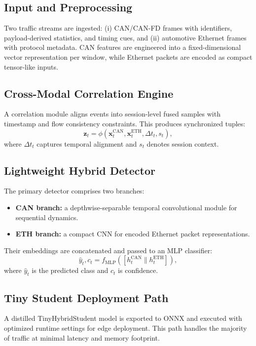 \documentclass[conference]{IEEEtran}
\begin{document}
\subsection{Input and Preprocessing}
Two traffic streams are ingested: (i) CAN/CAN-FD frames with identifiers, payload-derived statistics, and timing cues, and (ii) automotive Ethernet frames with protocol metadata. CAN features are engineered into a fixed-dimensional vector representation per window, while Ethernet packets are encoded as compact tensor-like inputs.

\subsection{Cross-Modal Correlation Engine}
A correlation module aligns events into session-level fused samples with timestamp and flow consistency constraints. This produces synchronized tuples:
\begin{equation}
\mathbf{z}_t = \phi\!\left(\mathbf{x}^{\text{CAN}}_t,\mathbf{x}^{\text{ETH}}_t,\Delta t_t, s_t\right),
\end{equation}
where $\Delta t_t$ captures temporal alignment and $s_t$ denotes session context.

\subsection{Lightweight Hybrid Detector}
The primary detector comprises two branches:
\begin{itemize}
    \item \textbf{CAN branch:} a depthwise-separable temporal convolutional module for sequential dynamics.
    \item \textbf{ETH branch:} a compact CNN for encoded Ethernet packet representations.
\end{itemize}
Their embeddings are concatenated and passed to an MLP classifier:
\begin{equation}
\hat{y}_t, c_t = f_{\text{MLP}}\!\left([h^{\text{CAN}}_t \| h^{\text{ETH}}_t]\right),
\end{equation}
where $\hat{y}_t$ is the predicted class and $c_t$ is confidence.

\subsection{Tiny Student Deployment Path}
A distilled TinyHybridStudent model is exported to ONNX and executed with optimized runtime settings for edge deployment. This path handles the majority of traffic at minimal latency and memory footprint.
\end{document}
